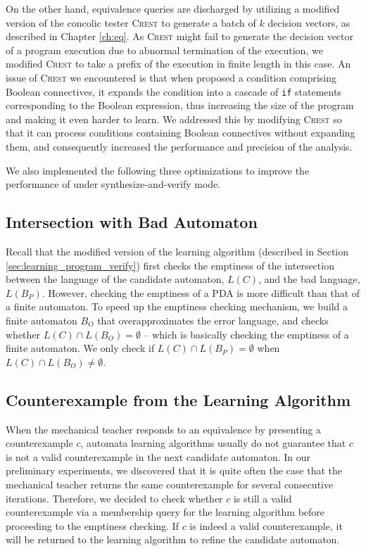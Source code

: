 On the other hand, equivalence queries are discharged by utilizing a modified version of the concolic tester \textsc{Crest} \cite{BurnimS08} \cite{crest} to generate a batch of $k$ decision vectors, as described in Chapter \ref{ch:eq}. As \textsc{Crest} might fail to generate the decision vector of a program execution due to abnormal termination of the execution, we modified \textsc{Crest} to take a prefix of the execution in finite length in this case. An issue of \textsc{Crest} we encountered is that when proposed a condition comprising Boolean connectives, it expands the condition into a cascade of \texttt{if} statements corresponding to the Boolean expression, thus increasing the size of the program and making it even harder to learn. We addressed this by modifying \textsc{Crest} so that it can process conditions containing Boolean connectives without expanding them, and consequently increased the performance and precision of the analysis. 

We also implemented the following three optimizations to improve the performance of \PACMAN under synthesize-and-verify mode.

\subsection{Intersection with Bad Automaton}\label{subsec:intersection_B}

Recall that the modified version of the learning algorithm (described in Section \ref{sec:learning_program_verify}) first checks the emptiness of the intersection between the language of the candidate automaton, $L(C)$, and the bad language, $L(B_P)$. However, checking the emptiness of a PDA is more difficult than that of a finite automaton. To speed up the emptiness checking mechanism, we build a finite automaton $B_O$ that overapproximates the error language, and checks whether $L(C) \cap L(B_O) = \emptyset$ -- which is basically checking the emptiness of a finite automaton. We only check if $L(C) \cap L(B_P) = \emptyset$ when $L(C) \cap L(B_O) \neq \emptyset$. 

\subsection{Counterexample from the Learning Algorithm}\label{subsec:cex_learning_alg}

When the mechanical teacher responds to an equivalence by presenting a counterexample $c$, automata learning algorithms usually do not guarantee that $c$ is not a valid counterexample in the next candidate automaton. In our preliminary experiments, we discovered that it is quite often the case that the mechanical teacher returns the same counterexample for several consecutive iterations. Therefore, we decided to check whether $c$ is still a valid counterexample via a membership query for the learning algorithm before proceeding to the emptiness checking. If $c$ is indeed a valid counterexample, it will be returned to the learning algorithm to refine the candidate automaton. 

